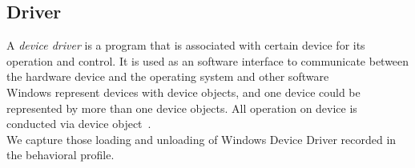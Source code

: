 \subsection{Driver}
\label{sub:Driver}
A \emph{device driver } is a program that is associated with certain device for its operation and control. It is used as an software interface to communicate between the hardware device and the operating system and other software~\cite[Device Driver]{devicedriver} \\
Windows represent devices with device objects, and one device could be represented by more than one device objects. All operation on device is conducted via device object~\cite[]{msdevice}.\\
We capture those loading and unloading of Windows Device Driver recorded in the behavioral profile.

